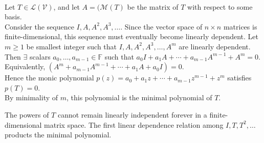 \begin{remark} \\
Let $T \in \mathcal{L}(\mathcal{V})$, and let $A = (\mathcal{M}(T)$ be the matrix of $T$ with respect to some basis.\\
Consider the sequence $I, A, A^2, A^3, \ldots$. Since the vector space of $n \times n$ matrices is finite-dimensional, this sequence must eventually become linearly dependent. Let $m \geq 1$ be smallest integer such that $I, A, A^2, A^3, \ldots, A^m$ are linearly dependent. Then $\exists$ scalars $a_0, \ldots, a_{m-1} \in \mathbb{F}$ such that $a_0 I + a_1 A + \cdots + a_{m-1} A^{m-1} + A^m = 0$.\\
Equivalently, $(A^m + a_{m-1} A^{m-1} + \cdots + a_1 A + a_0 I) = 0$.\\
Hence the monic polynomial $p(z) = a_0 + a_1 z + \cdots + a_{m-1}z^{m-1} + z^m$ satisfies $p(T) = 0$.\\
By minimality of $m$, this polynomial is the minimal polynomial of $T$.
\end{remark}

The powers of $T$ cannot remain linearly independent forever in a finite-dimensional matrix space. The first linear dependence relation among $I, T, T^2, \ldots$ products the minimal polynomial.

